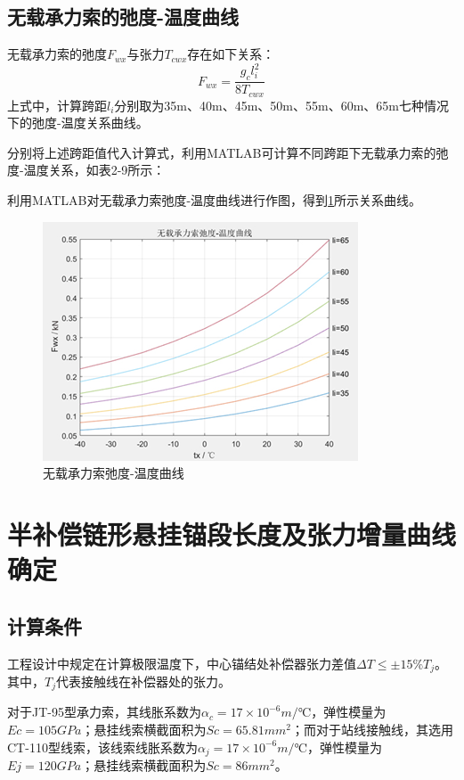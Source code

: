 \subsection{无载承力索的弛度-温度曲线}
无载承力索的弛度$F_{wx}$与张力$T_{cwx}$存在如下关系：
$$
F_{wx}=\frac{g_cl_{i}^{2}}{8T_{cwx}}
$$
上式中，计算跨距$l_i$分别取为35m、40m、45m、50m、55m、60m、65m七种情况下的弛度-温度关系曲线。

分别将上述跨距值代入计算式，利用MATLAB可计算不同跨距下无载承力索的弛度-温度关系，如表2-9所示：





利用MATLAB对无载承力索弛度-温度曲线进行作图，得到\ref{fig:-无载承力索弛度-温度曲线}所示关系曲线。

\begin{figure}[h]
	\centering
	\includegraphics[width=0.7\linewidth]{figures/无载承力索弛度-温度曲线}
	\caption{无载承力索弛度-温度曲线}
	\label{fig:-无载承力索弛度-温度曲线}
\end{figure}

\section{半补偿链形悬挂锚段长度及张力增量曲线确定}
\subsection{计算条件}
工程设计中规定在计算极限温度下，中心锚结处补偿器张力差值$\Delta T\leqslant \pm 15\%T_j$。其中，$T_j$代表接触线在补偿器处的张力。

对于JT-95型承力索，其线胀系数为$\alpha_c=17×10^{-6} m/℃$，弹性模量为$Ec=105GPa$；悬挂线索横截面积为$Sc=65.81mm^2$；而对于站线接触线，其选用CT-110型线索，该线索线胀系数为$\alpha_j=17×10^{-6}m/℃$，弹性模量为$Ej=120GPa$；悬挂线索横截面积为$Sc=86mm^2$。

